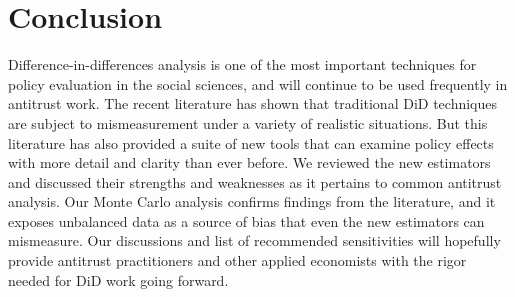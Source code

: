 \documentclass[12pt]{article}
\begin{document}
\section{Conclusion} \label{sec:conclusion}
\singlespace
Difference-in-differences analysis is one of the most important techniques for policy evaluation in the social sciences, and will continue to be used frequently in antitrust work. The recent literature has shown that traditional DiD techniques are subject to mismeasurement under a variety of realistic situations. But this literature has also provided a suite of new tools that can examine policy effects with more detail and clarity than ever before. We reviewed the new estimators and discussed their strengths and weaknesses as it pertains to common antitrust analysis. Our Monte Carlo analysis confirms findings from the literature, and it exposes unbalanced data as a source of bias that even the new estimators can mismeasure. Our discussions and list of recommended sensitivities will hopefully provide antitrust practitioners and other applied economists with the rigor needed for DiD work going forward.

\newpage
\doublespace
\printbibliography

\newpage
\end{document}
